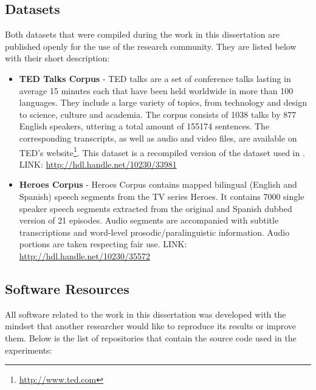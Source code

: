 \subsection{Datasets}
\label{conclusions:datasets}
Both datasets that were compiled during the work in this dissertation are published openly for the use of the research community. They are listed below with their short description:

\begin{itemize}
    \item \textbf{TED Talks Corpus} - TED talks are a set of conference talks lasting in average 15 minutes each that have been held worldwide in more than 100 languages. They include a large variety of topics, from technology and design to science, culture and academia. The corpus consists of 1038 talks by 877 English speakers, uttering a total amount of 155174 sentences. The corresponding transcripts, as well as audio and video files, are available on TED's website\footnote{\url{http://www.ted.com}}. This dataset is a recompiled version of the dataset used in \cite{Farrus:SP:2016}.
    LINK: \url{http://hdl.handle.net/10230/33981}
    
    \item \textbf{Heroes Corpus} - Heroes Corpus contains mapped bilingual (English and Spanish) speech segments from the TV series Heroes. It contains 7000 single speaker speech segments extracted from the original and Spanish dubbed version of 21 episodes. Audio segments are accompanied with subtitle transcriptions and word-level prosodic/paralinguistic information. Audio portions are taken respecting fair use. 
    LINK: \url{http://hdl.handle.net/10230/35572}
\end{itemize}

\subsection{Software Resources}
\label{conclusions:software}

All software related to the work in this dissertation was developed with the mindset that another researcher would like to reproduce its results or improve them. Below is the list of repositories that contain the source code used in the experiments:

